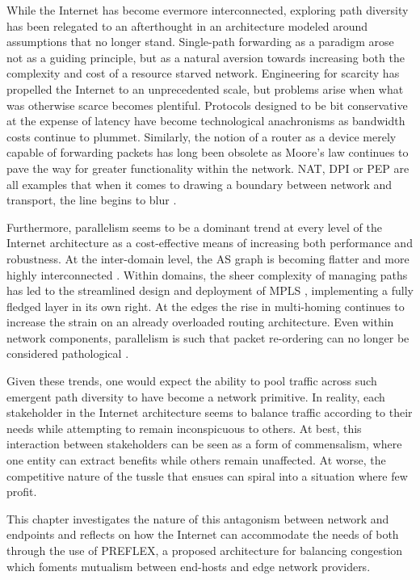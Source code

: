 While the Internet has become evermore interconnected, exploring path diversity has been relegated to an afterthought in an architecture modeled around assumptions that no longer stand. 
Single-path forwarding as a paradigm arose not as a guiding principle, but as a natural aversion towards increasing both the complexity and cost of a resource starved network.
Engineering for scarcity has propelled the Internet to an unprecedented scale, but problems arise when what was otherwise scarce becomes plentiful. 
Protocols designed to be bit conservative at the expense of latency have become technological anachronisms as bandwidth costs continue to plummet. 
Similarly, the notion of a router as a device merely capable of forwarding packets has long been obsolete as Moore's law continues to pave the way for greater functionality within the network. 
\ac{NAT}, \ac{DPI} or \ac{PEP} are all examples that when it comes to drawing a boundary between network and transport, the line begins to blur \cite{Ford:2008p34}.

Furthermore, parallelism seems to be a dominant trend at every level of the Internet architecture as a cost-effective means of increasing both performance and robustness. 
At the inter-domain level, the \ac{AS} graph is becoming flatter and more highly interconnected \cite{Haddadi:2010p129}. 
Within domains, the sheer complexity of managing paths has led to the streamlined design and deployment of \ac{MPLS} \cite{Rosen:2001p147}, implementing a fully fledged layer in its own right. 
At the edges the rise in multi-homing continues to increase the strain on an already overloaded routing architecture. 
Even within network components, parallelism is such that packet re-ordering can no longer be considered pathological \cite{Bennett:1999p120}.

Given these trends, one would expect the ability to pool traffic across such emergent path diversity to have become a network primitive. 
In reality, each stakeholder in the Internet architecture seems to balance traffic according to their needs while attempting to remain inconspicuous to others. 
At best, this interaction between stakeholders can be seen as a form of commensalism, where one entity can extract benefits while others remain unaffected. 
At worse, the competitive nature of the tussle \cite{Clark:2005p67} that ensues can spiral into a situation where few profit.

This chapter investigates the nature of this antagonism between network and endpoints and reflects on how the Internet can accommodate the needs of both through the use of \ac{PREFLEX}, a proposed architecture for balancing congestion which foments mutualism between end-hosts and edge network providers.
